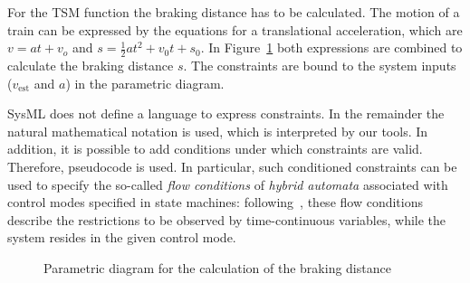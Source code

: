 \begin{example}
For the TSM function the braking distance has to be calculated. The motion of a train can be expressed by the
equations for a translational acceleration, which are $v=a t + v_o$ and
$s=\frac{1}{2} a t^2 + v_0t + s_0$. In Figure~\ref{fig:brakingdistance} both
expressions are combined to calculate the braking distance $s$. The constraints are bound 
to the system inputs ($v_\text{est}$ and $a$) in the parametric diagram.
\end{example}
SysML does not define a language to express constraints. In the remainder the natural mathematical notation is used, which is interpreted by our tools. In addition, it is possible to add conditions under which constraints are valid. Therefore, pseudocode is used. 
In particular, such conditioned constraints can be used to specify the
so-called \emph{flow conditions} of \emph{hybrid automata} associated with control modes specified in 
state machines: following~\cite{Hen96}, these flow conditions describe the 
restrictions to be observed by time-continuous variables, while the system resides in the
given control mode. 
\begin{figure}
\centering
{}
\caption{Parametric diagram for the calculation of the braking distance}
\label{fig:brakingdistance}
\end{figure}



